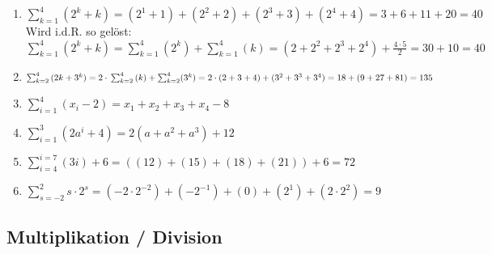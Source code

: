 {{\begin{enumerate}[label=\alph*)]
 \item $\sum_{k=1}^{4}{(2^k+k)} = (2^1+1) + (2^2+2) + (2^3+3) +
   (2^4+4) = 3 + 6 + 11 + 20 = 40$\\
   Wird i.d.R. so gelöst:\\
   $\sum_{k=1}^{4}{(2^k+k)} =
   \sum_{k=1}^{4}{(2^k)}+\sum_{k=1}^{4}{(k)} = (2+2^2+2^3+2^4) +
   \frac{4\cdot{}5}{2} = 30+10 = 40$

 \item $\sum_{k=2}^{4}{(2k+3^k)} = 2\cdot{}\sum_{k=2}^4{}(k) +
   \sum_{k=2}^4(3^k) = \\
   2\cdot{}(2+3+4) + (3^2+3^3+3^4) = 18 + (9+27+81) = 135$

 \item $\sum_{i=1}^{4}{(x_i-2)} = x_1+x_2+x_3+x_4 -8$
 \item $\sum_{i=1}^{3}{(2a^i+4)}  = 2(a + a^2 + a^3) + 12$
 \item $\sum_{i=4}^{i=7}(3i) + 6 = ((12) + (15) + (18) +(21) )+6=72$

 \item $\sum_{s=-2}^{2}s\cdot{}2^s = (-2\cdot{}2^{-2}) + (-2^{-1}) + (0) + (2^1) + (2\cdot{}2^2)=9$

\end{enumerate}
}%





\subsection{Multiplikation / Division}







}
